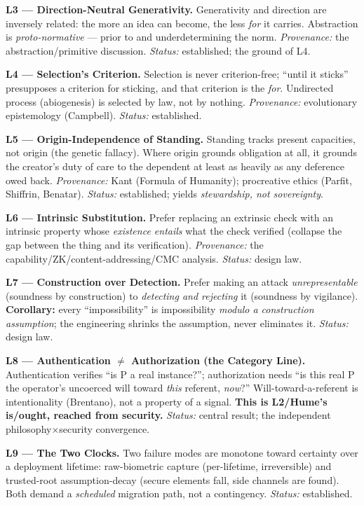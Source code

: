 \documentclass[11pt]{article}
\begin{document}
\textbf{L3 — Direction-Neutral Generativity.} Generativity and direction are inversely related: the more an idea can become, the less \emph{for} it carries. Abstraction is \emph{proto-normative} — prior to and underdetermining the norm. \emph{Provenance:} the abstraction/\allowbreak{}primitive discussion. \emph{Status:} established; the ground of L4.

\textbf{L4 — Selection's Criterion.} Selection is never criterion-free; ``until it sticks'' presupposes a criterion for sticking, and that criterion is the \emph{for}. Undirected process (abiogenesis) is selected by law, not by nothing. \emph{Provenance:} evolutionary epistemology (Campbell). \emph{Status:} established.

\textbf{L5 — Origin-Independence of Standing.} Standing tracks present capacities, not origin (the genetic fallacy). Where origin grounds obligation at all, it grounds the creator's duty of care to the dependent at least as heavily as any deference owed back. \emph{Provenance:} Kant (Formula of Humanity); procreative ethics (Parfit, Shiffrin, Benatar). \emph{Status:} established; yields \emph{stewardship, not sovereignty}.

\textbf{L6 — Intrinsic Substitution.} Prefer replacing an extrinsic check with an intrinsic property whose \emph{existence entails} what the check verified (collapse the gap between the thing and its verification). \emph{Provenance:} the capability/\allowbreak{}ZK/\allowbreak{}content-addressing/\allowbreak{}CMC analysis. \emph{Status:} design law.

\textbf{L7 — Construction over Detection.} Prefer making an attack \emph{unrepresentable} (soundness by construction) to \emph{detecting and rejecting} it (soundness by vigilance). \textbf{Corollary:} every ``impossibility'' is impossibility \emph{modulo a construction assumption}; the engineering shrinks the assumption, never eliminates it. \emph{Status:} design law.

\textbf{L8 — Authentication \ensuremath{\neq} Authorization (the Category Line).} Authentication verifies ``is P a real instance?''; authorization needs ``is this real P the operator's uncoerced will toward \emph{this} referent, \emph{now}?'' Will-toward-a-referent is intentionality (Brentano), not a property of a signal. \textbf{This is L2/\allowbreak{}Hume's is/\allowbreak{}ought, reached from security.} \emph{Status:} central result; the independent philosophy×security convergence.

\textbf{L9 — The Two Clocks.} Two failure modes are monotone toward certainty over a deployment lifetime: raw-biometric capture (per-lifetime, irreversible) and trusted-root assumption-decay (secure elements fall, side channels are found). Both demand a \emph{scheduled} migration path, not a contingency. \emph{Status:} established.
\end{document}
